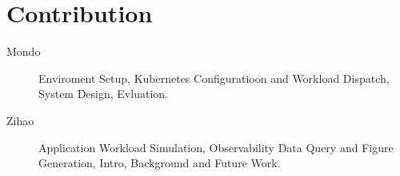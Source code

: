 \section{Contribution}

\begin{description}
    \item[Mondo] Enviroment Setup, Kubernetes Configuratioon and Workload Dispatch, System Design, Evluation. 
    \item [Zihao] Application Workload Simulation, Observability Data Query and Figure Generation, Intro, Background and Future Work. 
\end{description}